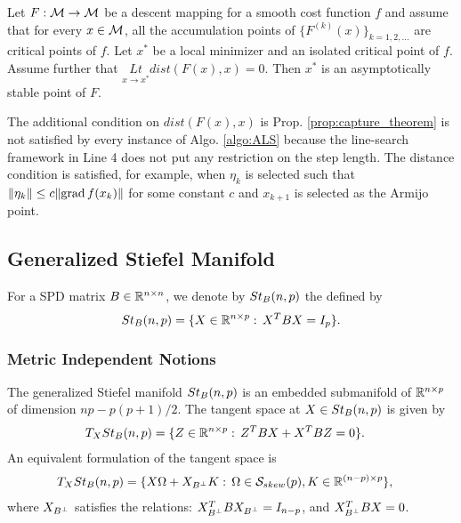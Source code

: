 \documentclass[11pt,a4paper]{article}
\begin{document}
\begin{proposition} \label{prop:capture_theorem}
Let $F:\mathcal{M}\rightarrow \mathcal{M}$ be a descent mapping for a smooth cost function $f$ and assume that for every $x\in \mathcal{M}$, all the accumulation points of $\{F^{(k)}(x)\}_{k = 1,2,\ldots}$ are critical points of $f$. Let $x^*$ be a local minimizer and an isolated critical point of $f$. Assume further that $\underset{x\rightarrow x^*}{Lt} dist(F(x),x) = 0$. Then $x^*$ is an asymptotically stable point of $F$.
\end{proposition}

\begin{remark}
The additional condition on $dist(F(x),x)$ is Prop. \ref{prop:capture_theorem} is not satisfied by every instance of Algo. \ref{algo:ALS} because the line-search framework in Line 4 does not put any restriction on the step length. The distance condition is satisfied, for example, when $\eta_k$ is selected such that $\|\eta_k\|\le c\|\text{grad}\, f(x_k)\|$ for some constant $c$ and $x_{k+1}$ is selected as the Armijo point.
\end{remark}

\subsection{Generalized Stiefel Manifold}

For a SPD matrix $B\in \mathbb{R}^{n\times n}$, we denote by $St_B(n,p)$ the  defined by
\begin{equation}\label{eqn:gen_stiefel_manifold}
    St_B(n,p) = \{X\in\mathbb{R}^{n\times p}:\,X^TBX = I_p\}.
\end{equation}

\subsubsection{Metric Independent Notions}

\begin{proposition}
The generalized Stiefel manifold $St_B(n,p)$ is an embedded submanifold of $\mathbb{R}^{n\times p}$ of dimension $np-p(p+1)/2$. The tangent space at $X\in St_B(n,p)$ is given by 
\begin{align}\label{eqn:tangent_space_genst_1}
T_XSt_B(n,p) &= \{Z\in\mathbb{R}^{n\times p}:\,Z^TBX + X^TBZ = 0\}.
\end{align}
An equivalent formulation of the tangent space is
\begin{align}\label{eqn:tangent_space_genst_2}
T_XSt_B(n,p) &= \{X\Omega + X_{B^\perp} K:\, \Omega \in \mathcal{S}_{skew}(p),K\in\mathbb{R}^{(n-p)\times p}\},
\end{align}
where $X_{B^\perp}$ satisfies the relations: $X_{B^\perp}^TBX_{B^\perp} = I_{n-p}$, and $X_{B^\perp}^T BX = 0$.
\end{proposition}
\end{document}
